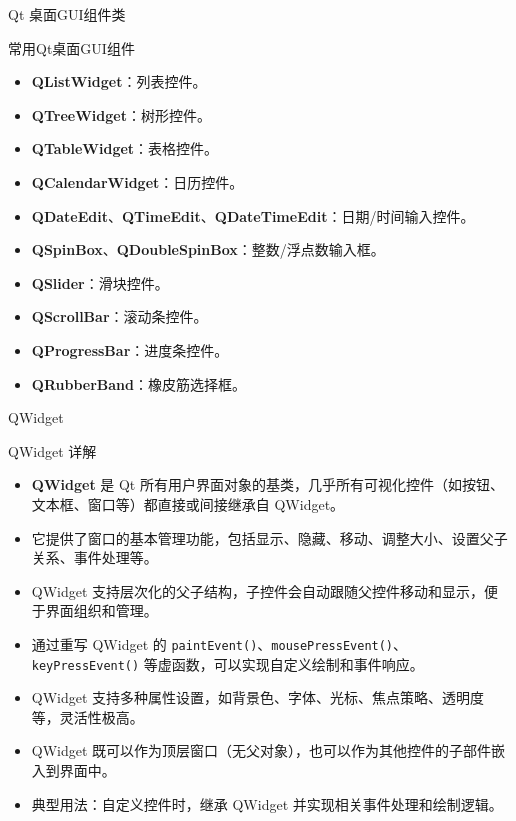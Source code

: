 \documentclass[UTF8,aspectratio=169]{beamer}
\begin{document}
\begin{frame}{Qt 桌面GUI组件类}
\begin{ytublock}{常用Qt桌面GUI组件}
{\begin{multicols}{2}
\begin{itemize}
            \item \textbf{QListWidget}：列表控件。
            \item \textbf{QTreeWidget}：树形控件。
            \item \textbf{QTableWidget}：表格控件。
            \item \textbf{QCalendarWidget}：日历控件。
            \item \textbf{QDateEdit}、\textbf{QTimeEdit}、\textbf{QDateTimeEdit}：日期/时间输入控件。
            \item \textbf{QSpinBox}、\textbf{QDoubleSpinBox}：整数/浮点数输入框。
            \item \textbf{QSlider}：滑块控件。
            \item \textbf{QScrollBar}：滚动条控件。
            \item \textbf{QProgressBar}：进度条控件。
            \item \textbf{QRubberBand}：橡皮筋选择框。
        \end{itemize}
        \end{multicols}
        }
    \end{ytublock}
\end{frame}

\begin{frame}{QWidget}
    \begin{ytublock}{QWidget 详解}
        \begin{itemize}
            \item \textbf{QWidget} 是 Qt 所有用户界面对象的基类，几乎所有可视化控件（如按钮、文本框、窗口等）都直接或间接继承自 QWidget。
            \item 它提供了窗口的基本管理功能，包括显示、隐藏、移动、调整大小、设置父子关系、事件处理等。
            \item QWidget 支持层次化的父子结构，子控件会自动跟随父控件移动和显示，便于界面组织和管理。
            \item 通过重写 QWidget 的 \texttt{paintEvent()}、\texttt{mousePressEvent()}、\texttt{keyPressEvent()} 等虚函数，可以实现自定义绘制和事件响应。
            \item QWidget 支持多种属性设置，如背景色、字体、光标、焦点策略、透明度等，灵活性极高。
            \item QWidget 既可以作为顶层窗口（无父对象），也可以作为其他控件的子部件嵌入到界面中。
            \item 典型用法：自定义控件时，继承 QWidget 并实现相关事件处理和绘制逻辑。
        \end{itemize}
    \end{ytublock}
\end{frame}
\end{document}
